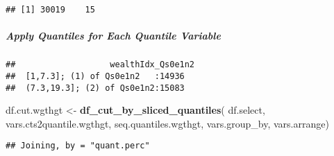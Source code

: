 \documentclass[
]{article}
\newenvironment{Shaded}{\begin{snugshade}}{\end{snugshade}}
\newcommand{\CommentTok}[1]{\textcolor[rgb]{0.56,0.35,0.01}{\textit{#1}}}
\newcommand{\KeywordTok}[1]{\textcolor[rgb]{0.13,0.29,0.53}{\textbf{#1}}}
\newcommand{\NormalTok}[1]{#1}
\newcommand{\OperatorTok}[1]{\textcolor[rgb]{0.81,0.36,0.00}{\textbf{#1}}}
\newcommand{\StringTok}[1]{\textcolor[rgb]{0.31,0.60,0.02}{#1}}
\begin{document}
\begin{verbatim}
## [1] 30019    15
\end{verbatim}

\hypertarget{apply-quantiles-for-each-quantile-variable}{%
\subparagraph{Apply Quantiles for Each Quantile
Variable}\label{apply-quantiles-for-each-quantile-variable}}

\begin{Shaded}
\end{Shaded}

\begin{verbatim}
##                   wealthIdx_Qs0e1n2
##  [1,7.3]; (1) of Qs0e1n2   :14936  
##  (7.3,19.3]; (2) of Qs0e1n2:15083
\end{verbatim}

\begin{Shaded}
\end{Shaded}

\begin{Shaded}
\begin{Highlighting}[]
\NormalTok{df.cut.wgthgt <-}\StringTok{ }\KeywordTok{df_cut_by_sliced_quantiles}\NormalTok{(}
\NormalTok{  df.select, vars.cts2quantile.wgthgt, seq.quantiles.wgthgt, vars.group_by, vars.arrange)}
\end{Highlighting}
\end{Shaded}

\begin{verbatim}
## Joining, by = "quant.perc"
\end{verbatim}

\begin{Shaded}
\end{Shaded}
\end{document}
